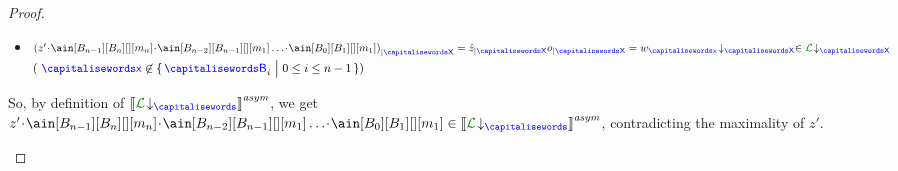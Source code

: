 \begin{proof}
\begin{description}
\begin{itemize}
(since, as previously shown, \\
$\proj{\acword_{\ptp[B_{i}]}}{B_{i}}= \filter{\hat z}{\ptp[B_{i}]}\cat\aout[B_{i}][B_{i+1}][][m_{i+1}]$ 
and $\proj{\acword'_{\ptp[B_{i}]}}{B_i} = \proj{\acword}{B_i}$
and $\acword\cat \gint[][{B_{i+1}}][m_{i}][B_i]\cat\gint[][B_i][m_{i+1}][{B_{i+1}}]\in\clang$)
\item
$ \filter{(z'\cat \ain[B_{n-1}][B_n][][m_n] \cat\ain[B_{n-2}][B_{n-1}][][m_1]\ldots\cat\ain[B_0][B_1][][m_1])}{\ptp[{X}]}
= \filter{\hat z}{\ptp[X]} \filter{o}{\ptp[X]} 
= \proj{\acword_{\px}}{X} \in\proj{\clang}{X}$\\
   $\text{\footnotesize ( $\px\not\in\Set{\q_i \sst 0\leq i\leq n-1}$)}$
\end{itemize}
So, by definition of $\asem{\proj{\clang}{}}$, we get $z'\cat \ain[B_{n-1}][B_n][][m_n] \cat\ain[B_{n-2}][B_{n-1}][][m_1]\ldots\cat\ain[B_0][B_1][][m_1]\in\asem{\proj{\clang}{}}$, contradicting the maximality of $z'$.\\




\end{description}
\end{proof}
